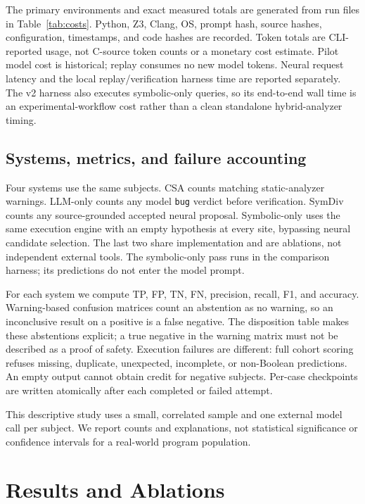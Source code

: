 \documentclass[sigconf]{acmart}
\begin{document}
The primary environments and exact measured totals are generated from run files
in Table~\ref{tab:costs}. Python, Z3, Clang, OS, prompt hash, source hashes,
configuration, timestamps, and code hashes are recorded. Token totals are
CLI-reported usage, not C-source token counts or a monetary cost estimate.
Pilot model cost is historical; replay consumes no new model tokens. Neural
request latency and the local replay/verification harness time are reported
separately. The v2 harness also executes symbolic-only queries, so its end-to-end
wall time is an experimental-workflow cost rather than a clean standalone
hybrid-analyzer timing.

\subsection{Systems, metrics, and failure accounting}
Four systems use the same subjects. CSA counts matching static-analyzer
warnings. LLM-only counts any model \texttt{bug} verdict before verification.
SymDiv counts any source-grounded accepted neural proposal. Symbolic-only uses
the same execution engine with an empty hypothesis at every site, bypassing
neural candidate selection. The last two share implementation and are ablations,
not independent external tools. The symbolic-only pass runs in the comparison
harness; its predictions do not enter the model prompt.

For each system we compute TP, FP, TN, FN, precision, recall, F1, and accuracy.
Warning-based confusion matrices count an abstention as no warning, so an
inconclusive result on a positive is a false negative. The disposition table
makes these abstentions explicit; a true negative in the warning matrix must
not be described as a proof of safety. Execution failures are different: full
cohort scoring refuses missing, duplicate, unexpected, incomplete, or
non-Boolean predictions. An empty output cannot obtain credit for negative
subjects. Per-case checkpoints are written atomically after each completed or
failed attempt.

This descriptive study uses a small, correlated sample and one external
model call per subject. We report counts and explanations, not statistical
significance or confidence intervals for a real-world program population.

\section{Results and Ablations}

\end{document}
